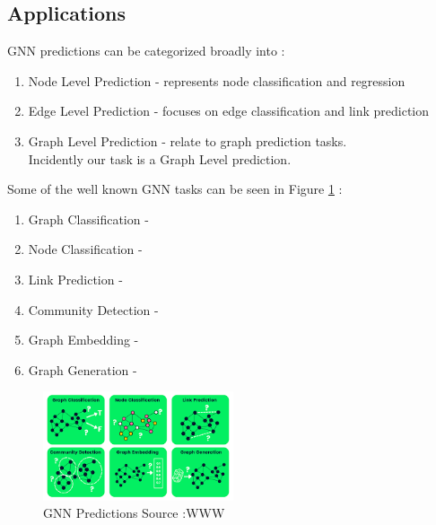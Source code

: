 \documentclass{report} %
\begin{document}
\subsection{Applications}\label{subsec:Applications}

\ac{GNN} predictions can be categorized broadly into : \cite{GNN-2019}
\begin{enumerate}
    \item Node Level Prediction - represents node classification and regression
    \item Edge Level Prediction - focuses on edge classification and link prediction
    \item Graph Level Prediction - relate to graph prediction tasks.\\
    Incidently our task is a Graph Level prediction.
\end{enumerate}

Some of the well known \ac{GNN} tasks can be seen in Figure \ref{fig:GNN Predictions} :
\begin{enumerate}
    \item Graph Classification - 
    \item Node Classification - 
    \item Link Prediction - 
    \item Community Detection - 
    \item Graph Embedding - 
    \item Graph Generation - 
\end{enumerate}

\begin{figure}[H]
    \centering
    \includegraphics[width=0.5\textwidth]{./ReportImages/GraphTasks.png} 
    \caption{\ac{GNN} Predictions Source :WWW} 
    \label{fig:GNN Predictions}
\end{figure}
\end{document}
